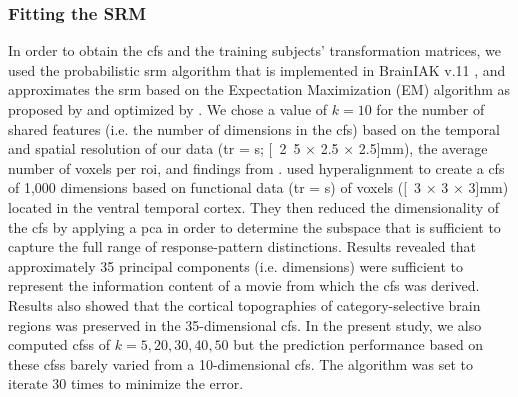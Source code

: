 \subsubsection{Fitting the SRM}
%
In order to obtain the \ac{cfs} and the training subjects' transformation
matrices, we used the probabilistic \ac{srm} algorithm that is implemented in
BrainIAK v.11 \citep[Brain Imaging Analysis Kit;][]{kumar2020brainiak,
kumar2020brainiaktutorial}, and approximates the \ac{srm} based on the
Expectation Maximization (EM) algorithm as proposed by \citet{chen2015reduced}
and optimized by \citet{anderson2016enabling}.
%
%
We chose a value of $k=10$ for the number of shared features (i.e. the number of
dimensions in the \ac{cfs}) based on the temporal and spatial resolution of our
data (\ac{tr} = \unit[2]{s}; \unit[2.5 $\times$ 2.5 $\times$ 2.5]{mm}), the
average number of voxels per \ac{roi}, and findings from
\citet{haxby2011common}.
%
\citet{haxby2011common} used hyperalignment to create a \ac{cfs} of 1,000
dimensions based on functional data (\ac{tr} = \unit[3]{s}) of voxels (\unit[3
$\times$ 3 $\times$ 3]{mm}) located in the ventral temporal cortex.
%
They then reduced the dimensionality of the \ac{cfs} by applying a \ac{pca} in
order to determine the subspace that is sufficient to capture the full range of
response-pattern distinctions.
%
Results revealed that approximately 35 principal components (i.e. dimensions)
were sufficient to represent the information content of a movie from which the
\ac{cfs} was derived.
%
Results also showed that the cortical topographies of category-selective brain
regions was preserved in the 35-dimensional \ac{cfs}.
In the present study, we also computed \acp{cfs} of $k=5, 20, 30, 40, 50$ but
the prediction performance based on these \acp{cfs} barely varied from a
10-dimensional \ac{cfs}.
The algorithm was set to iterate 30 times to minimize the error.


